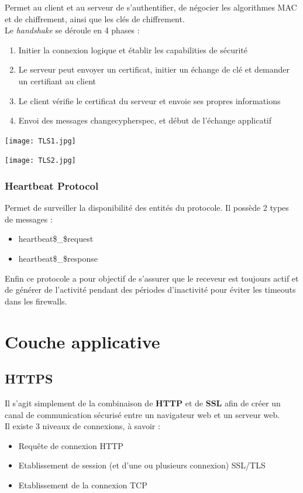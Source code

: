\documentclass{report}
\begin{document}
Permet au client et au serveur de s'authentifier, de négocier les algorithmes MAC et de chiffrement, ainsi que les clés de chiffrement.\\ Le \textit{handshake} se déroule en 4 phases :
\begin{enumerate}
    \item Initier la connexion logique et établir les capabilities de sécurité
    \item Le serveur peut envoyer un certificat, initier un échange de clé et demander un certifiant au client
    \item Le client vérifie le certificat du serveur et envoie ses propres informations
    \item Envoi des messages changecypherspec, et début de l'échange applicatif
\end{enumerate}

 \texttt{[image: TLS1.jpg]}

  \texttt{[image: TLS2.jpg]}

\subsubsection{Heartbeat Protocol}

Permet de surveiller la disponibilité des entités du protocole. Il possède 2 types de messages :
\begin{itemize}
    \item heartbeat\$\_\$request
    \item heartbeat\$\_\$response
\end{itemize}

Enfin ce protocole a pour objectif de s'assurer que le receveur est toujours actif et de générer de l'activité pendant des périodes d'inactivité pour éviter les timeouts dans les firewalls.

\section{Couche applicative}

\subsection{HTTPS}

Il s'agit simplement de la combinaison de \textbf{HTTP} et de \textbf{SSL} afin de créer un canal de communication sécurisé entre un navigateur web et un serveur web. \\Il existe 3 niveaux de connexions, à savoir :
\begin{itemize}
    \item Requête de connexion HTTP
    \item Etablissement de session (et d'une ou plusieurs connexion) SSL/TLS
    \item Etablissement de la connexion TCP
\end{itemize}
\end{document}
